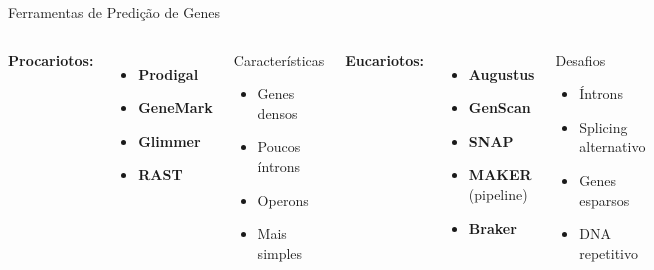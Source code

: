 \begin{frame}[shrink=15]{Ferramentas de Predição de Genes}
\begin{columns}[onlytextwidth]
\textbf{Procariotos:}
\begin{itemize}
    \item \textbf{Prodigal}
    \item \textbf{GeneMark}
    \item \textbf{Glimmer}
    \item \textbf{RAST}
\end{itemize}

\vspace{0.3cm}

\begin{exampleblock}{Características}
\begin{itemize}
    \item Genes densos
    \item Poucos íntrons
    \item Operons
    \item Mais simples
\end{itemize}
\end{exampleblock}

\textbf{Eucariotos:}
\begin{itemize}
    \item \textbf{Augustus}
    \item \textbf{GenScan}
    \item \textbf{SNAP}
    \item \textbf{MAKER} (pipeline)
    \item \textbf{Braker}
\end{itemize}

\vspace{0.3cm}

\begin{alertblock}{Desafios}
\begin{itemize}
    \item Íntrons
    \item Splicing alternativo
    \item Genes esparsos
    \item DNA repetitivo
\end{itemize}
\end{alertblock}
\end{columns}
\end{frame}

